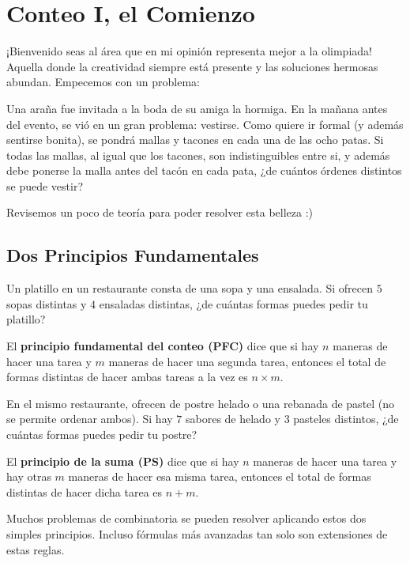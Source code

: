 \chapter{Conteo I, el Comienzo}

¡Bienvenido seas al área que en mi opinión representa mejor a la olimpiada! 
Aquella donde la creatividad siempre está presente y las soluciones 
hermosas abundan. Empecemos con un problema:

Una araña fue invitada a la boda de su amiga la hormiga. 
En la mañana antes del evento, se vió en un gran problema: 
vestirse. Como quiere ir formal (y además sentirse bonita), 
se pondrá mallas y tacones en cada una de las ocho patas. 
Si todas las mallas, al igual que los tacones, son 
indistinguibles entre si, y además debe ponerse la malla 
antes del tacón en cada pata, ¿de cuántos órdenes distintos 
se puede vestir?

Revisemos un poco de teoría para poder resolver esta belleza :)

\section{Dos Principios Fundamentales}

\begin{example}
    Un platillo en un restaurante consta de una sopa y una 
    ensalada. Si ofrecen $5$ sopas distintas y $4$ ensaladas 
    distintas, ¿de cuántas formas puedes pedir tu platillo?
\end{example}

El \textbf{principio fundamental del conteo (PFC)} dice que si 
hay $n$ maneras de hacer una tarea y $m$ maneras de hacer una 
segunda tarea, entonces el total de formas distintas de hacer 
ambas tareas a la vez es $n \times m$.

\begin{example}
    En el mismo restaurante, ofrecen de postre helado o una 
    rebanada de pastel (no se permite ordenar ambos). Si hay $7$ 
    sabores de helado y $3$ pasteles distintos, ¿de cuántas 
    formas puedes pedir tu postre? 
\end{example}

El \textbf{principio de la suma (PS)} dice que si 
hay $n$ maneras de hacer una tarea y  hay otras $m$ maneras de 
hacer esa misma tarea, entonces el total de formas distintas de 
hacer dicha tarea es $n + m$.

Muchos problemas de combinatoria se pueden resolver aplicando 
estos dos simples principios. Incluso fórmulas más avanzadas 
tan solo son extensiones de estas reglas.

